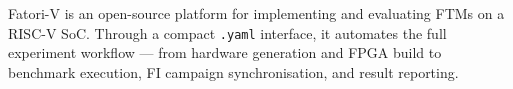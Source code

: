 \ac{Fatori-V} is an open-source platform for implementing and evaluating \acp{FTM} on a \ac{RISC-V} \ac{SoC}. Through a compact \texttt{.yaml} interface, it automates the full experiment workflow — from hardware generation and \ac{FPGA} build to benchmark execution, \ac{FI} campaign synchronisation, and result reporting.
